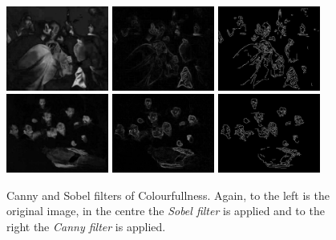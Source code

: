 \documentclass[11pt,a4paper,draft]{report}
\begin{document}
\begin{multicols}{2}
\begin{figure}[tbp]
\centering
\includegraphics[width=0.30\textwidth]{CS_caravaggio_1962_139_1}
\includegraphics[width=0.30\textwidth]{sobel_CS_caravaggio_1962_139_1}
\includegraphics[width=0.30\textwidth]{canny_CS_caravaggio_1962_139_1}
\includegraphics[width=0.30\textwidth]{CS_rembrandt_eu_464}
\includegraphics[width=0.30\textwidth]{sobel_CS_rembrandt_eu_464}
\includegraphics[width=0.30\textwidth]{canny_CS_rembrandt_eu_464}
\caption[Canny and Sobel filters of Colourfullness]{Canny and Sobel filters of
Colourfullness.  Again, to the left is the original image, in the centre the
\emph{Sobel filter} is applied and to the right the \emph{Canny filter} is
applied.}
\label{fig:cannysobelcs}
\end{figure}


\end{multicols}
\end{document}
